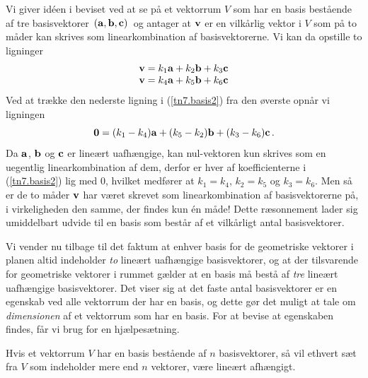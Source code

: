 \begin{bevis}
Vi giver idéen i beviset ved at se på et vektorrum $V$ som har en basis bestående af tre basisvektorer $\,(\mathbf{a},\mathbf{b},\mathbf{c})\,$ og antager at $\mathbf{v}$ er en vilkårlig vektor i $V$ som på to måder kan skrives som linearkombination af basisvektorerne.  Vi kan da opstille to ligninger
\begin{equation}\label{tn7.basis2}
\begin{array}{c}
\mathbf v=k_1\mathbf{a}+k_2\mathbf{b}+k_3\mathbf{c}\\
\mathbf v=k_4\mathbf{a}+k_5\mathbf{b}+k_6\mathbf{c}
\end{array}
\end{equation}
Ved at trække den nederste ligning i (\ref{tn7.basis2}) fra den øverste opnår vi ligningen
\begin{equation}\label{tn7.basis3}
\mathbf 0=(k_1-k_4)\mathbf{a}+(k_5-k_2)\mathbf{b}+(k_3-k_6)\mathbf{c}\,.
\end{equation}
Da $\mathbf{a}$, $\mathbf{b}$ og $\mathbf{c}$ er lineært uafhængige, kan nul-vektoren kun skrives som en uegentlig linearkombination af dem, derfor er hver af koefficienterne i (\ref{tn7.basis2}) lig med $0$, hvilket medfører at $k_1=k_4$, $k_2=k_5$ og $k_3=k_6$. Men så er de to måder $\mathbf{v}$ har været skrevet som linearkombination af basisvektorerne på, i virkeligheden den samme, der findes kun én måde! \bs
Dette ræsonnement lader sig umiddelbart udvide til en basis som består af et vilkårligt antal basisvektorer.
\end{bevis}

Vi vender nu tilbage til det faktum at enhver basis for de geometriske vektorer i planen altid indeholder \textit{to} lineært uafhængige basisvektorer, og at der tilsvarende for geometriske vektorer i rummet gælder at en basis må bestå af \textit{tre} lineært uafhængige basisvektorer. Det viser sig at det faste antal basisvektorer er en egenskab ved alle vektorrum der har en basis, og dette gør det muligt at tale om \textit{dimensionen} af et vektorrum som har en basis. For at bevise at egenskaben findes, får vi brug for en hjælpesætning.

\begin{lemma}\label{fundLemma}
Hvis et vektorrum $V$ har en basis bestående af $n$ basisvektorer, så vil ethvert sæt fra $V$ som indeholder mere end $n$ vektorer, være lineært afhængigt.
\end{lemma}

